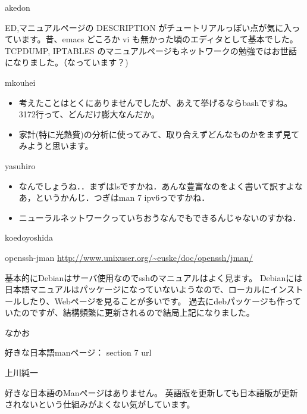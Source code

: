 \begin{prework}{ akedon }

 ED,マニュアルページの DESCRIPTION がチュートリアルっぽい点が気に入っています。昔、emacs どころか vi も無かった頃のエディタとして基本でした。
 TCPDUMP, IPTABLES のマニュアルページもネットワークの勉強ではお世話になりました。（なっています？)


\end{prework}



\begin{prework}{ mkouhei }
\begin{itemize}
 
 \item  考えたことはとくにありませんでしたが、あえて挙げるならbashですね。3172行って、どんだけ膨大なんだか。

 \item  家計(特に光熱費)の分析に使ってみて、取り合えずどんなものかをまず見てみようと思います。
\end{itemize}

\end{prework}



\begin{prework}{ yasuhiro }

\begin{itemize}
 \item  なんでしょうね．．まずはlsですかね．あんな豊富なのをよく書いて訳すよなあ，というかんじ．つぎはman 7 ipv6っですかね．

 \item  ニューラルネットワークっていちおうなんでもできるんじゃないのすかね．
\end{itemize}

\end{prework}

\begin{prework}{ koedoyoshida }


openssh-jman
\url{http://www.unixuser.org/~euske/doc/openssh/jman/}

基本的にDebianはサーバ使用なのでsshのマニュアルはよく見ます。
Debianには日本語マニュアルはパッケージになっていないようなので、ローカルにインストールしたり、Webページを見ることが多いです。
過去にdebパッケージも作っていたのですが、結構頻繁に更新されるので結局上記になりました。


\end{prework}



\begin{prework}{ なかお }

好きな日本語manページ：
section 7 url

\end{prework}



\begin{prework}{ 上川純一 }

好きな日本語のManページはありません。
英語版を更新しても日本語版が更新されないという仕組みがよくない気がしています。


\end{prework}

